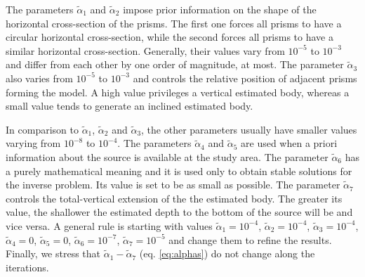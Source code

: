 The parameters $\tilde{\alpha}_1$ and $\tilde{\alpha}_2$ impose prior information on the 
shape of the horizontal cross-section of the prisms. 
The first one forces all prisms to have a circular horizontal cross-section, while 
the second forces all prisms to have a similar horizontal cross-section.
Generally, their values vary from $10^{-5}$ to $10^{-3}$ and differ from
each other by one order of magnitude, at most.
The parameter $\tilde{\alpha}_3$ also varies from $10^{-5}$ to $10^{-3}$ and 
controls the relative position of adjacent prisms forming the model.
A high value privileges a vertical estimated body, whereas a small value 
tends to generate an inclined estimated body.

In comparison to $\tilde{\alpha}_1$, $\tilde{\alpha}_2$ and $\tilde{\alpha}_3$,
the other parameters usually have smaller values varying from $10^{-8}$ to $10^{-4}$.
The parameters $\tilde{\alpha}_4$ and $\tilde{\alpha}_5$ are used when a priori
information about the source is available at the study area.
The parameter $\tilde{\alpha}_6$ has a purely mathematical meaning and it is 
used only to obtain stable solutions for the inverse problem.
Its value is set to be as small as possible.
The parameter $\tilde{\alpha}_7$ controls the total-vertical extension of the 
the estimated body. 
The greater its value, the shallower the estimated depth to the bottom of the source will be 
and vice versa.
A general rule is starting with values 
$\tilde{\alpha}_1 = 10^{-4}$, $\tilde{\alpha}_2 = 10^{-4}$, $\tilde{\alpha}_3 = 10^{-4}$,
$\tilde{\alpha}_4 = 0$, $\tilde{\alpha}_5 = 0$, $\tilde{\alpha}_6 = 10^{-7}$, 
$\tilde{\alpha}_7 = 10^{-5}$ and change them to refine the results.
Finally, we stress that $\tilde{\alpha}_1 - \tilde{\alpha}_7$ (eq. \ref{eq:alphas})
do not change along the iterations.

